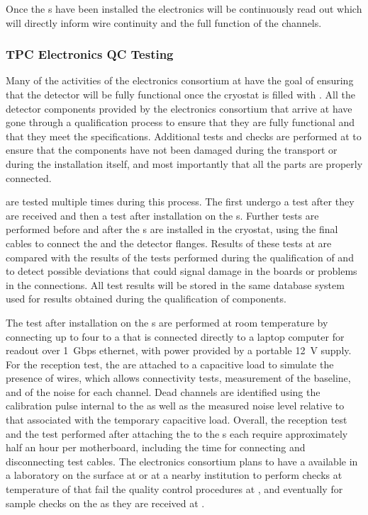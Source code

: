 Once the s have been installed the  electronics will be continuously read out which will directly inform wire continuity and the full function of the channels. 

\subsubsection{TPC Electronics QC Testing}

Many of the activities of the  electronics
consortium at  have the goal of 
ensuring that the detector will be fully functional once the cryostat
is filled with . All the detector components provided
by the  electronics consortium that arrive 
at  have gone through a qualification process to ensure
that they are fully functional and that they meet the  
specifications. Additional tests and checks are performed at 
to ensure that the components have not
been damaged during the transport or during the installation itself,
and most importantly that all the parts are properly connected.

 are tested multiple times during this process. 
The  first undergo a test after they are received and then a test after 
installation on the s. Further 
tests are performed before and after the 
s are installed in the cryostat, using the final cables to connect the  and the detector flanges. 
Results of these tests at  are compared with the results of the
tests performed during the qualification of  and
 to detect possible deviations that could signal 
damage in the boards or problems in the connections. All test 
results will be stored in the same database system used for
results obtained during the qualification of components.

The test after installation on the s are performed at room temperature 
by connecting up to four  to a  that is 
connected directly to a laptop computer for readout over 1~Gbps
ethernet, with power provided by a portable 12~V supply. For 
the reception test, the  are attached to a capacitive 
load to simulate the presence of wires, which allows connectivity 
tests, measurement of the baseline, and \rms of the noise for 
each channel. Dead channels are identified using the calibration 
pulse internal to the   as well as the measured
noise level relative to that associated with the temporary capacitive load.
Overall, the reception test and the test performed after attaching the
 to the s each require approximately half an hour per
motherboard, including  the time for connecting and disconnecting test cables.
The  electronics consortium plans to have a  available
in a laboratory on the surface at  or at a nearby institution to perform checks at \lntwo temperature
of  that fail the quality control procedures at ,
and eventually for sample checks on the  as they are received
at .

